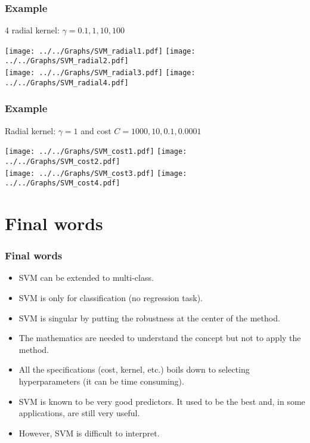 \begin{frame}
\frametitle{Example}
\scriptsize
4 radial kernel: $\gamma=0.1, 1, 10, 100$ 
\normalsize
\begin{center}
\texttt{[image: ../../Graphs/SVM\_radial1.pdf]} 
\texttt{[image: ../../Graphs/SVM\_radial2.pdf]} \\
\texttt{[image: ../../Graphs/SVM\_radial3.pdf]} 
\texttt{[image: ../../Graphs/SVM\_radial4.pdf]} 
\end{center}
\end{frame}
\begin{frame}
\frametitle{Example}
\scriptsize
Radial kernel: $\gamma=1$ and cost $C=1000, 10, 0.1, 0.0001$ 
\normalsize
\begin{center}
\texttt{[image: ../../Graphs/SVM\_cost1.pdf]} 
\texttt{[image: ../../Graphs/SVM\_cost2.pdf]} \\
\texttt{[image: ../../Graphs/SVM\_cost3.pdf]} 
\texttt{[image: ../../Graphs/SVM\_cost4.pdf]} 
\end{center}
\end{frame}
\section{Final words}
\begin{frame}
\frametitle{Final words}
\begin{itemize}
\item SVM can be extended to multi-class.
\item SVM is only for classification (no regression task).
\item SVM is singular by putting the robustness at the center of the method.
\item The mathematics are needed to understand the concept but not to apply the method.
\item All the specifications (cost, kernel, etc.) boils down to selecting hyperparameters (it can be time consuming).
\item SVM is known to be very good predictors. It used to be the best and, in some applications, are still very useful. 
\item However, SVM is difficult to interpret.
\end{itemize}
\end{frame}


